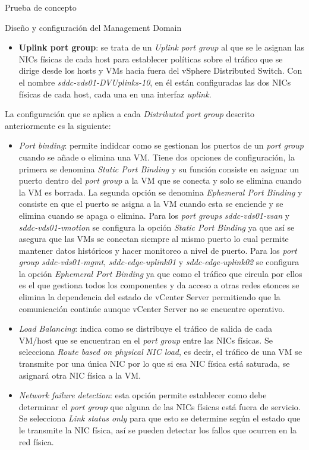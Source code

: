 \begin{section}{Prueba de concepto}
\begin{subsection}{Diseño y configuración del Management Domain}
\begin{itemize}
            \item \textbf{Uplink port group}: se trata de un \textit{Uplink port group} al que se le asignan las NICs físicas de cada host para establecer políticas sobre el tráfico que se dirige desde los hosts y VMs hacia fuera del vSphere Distributed Switch. Con el nombre \textit{sddc-vds01-DVUplinks-10}, en él están configuradas las dos NICs físicas de cada host, cada una en una interfaz \textit{uplink}.
            
    \end{itemize}
    La configuración que se aplica a cada \textit{Distributed port group} descrito anteriormente es la siguiente:
    \begin{itemize}
      \item \textit{Port binding}: permite indidcar como se gestionan los puertos de un \textit{port group} cuando se añade o elimina una VM. Tiene dos opciones de configuración, la primera se denomina \textit{Static Port Binding} y su función consiste en asignar un puerto dentro del \textit{port group} a la VM que se conecta y solo se elimina cuando la VM es borrada. La segunda opción se denomina \textit{Ephemeral Port Binding} y consiste en que el puerto se asigna a la VM cuando esta se enciende y se elimina cuando se apaga o elimina. Para los \textit{port groups} \textit{sddc-vds01-vsan} y \textit{sddc-vds01-vmotion} se configura la opción \textit{Static Port Binding} ya que así se asegura que las VMs se conectan siempre al mismo puerto lo cual permite mantener datos históricos y hacer monitoreo a nivel de puerto. Para los \textit{port group} \textit{sddc-vds01-mgmt}, \textit{sddc-edge-uplink01} y \textit{sddc-edge-uplink02} se configura la opción \textit{Ephemeral Port Binding} ya que como el tráfico que circula por ellos es el que gestiona todos los componentes y da acceso a otras redes etonces se elimina la dependencia del estado de vCenter Server permitiendo que la comunicación continúe aunque vCenter Server no se encuentre operativo.
    
      \item \textit{Load Balancing}: indica como se distribuye el tráfico de salida de cada VM/host que se encuentran en el \textit{port group} entre las NICs físicas. Se selecciona \textit{Route based on physical NIC load}, es decir, el tráfico de una VM se transmite por una única NIC por lo que si esa NIC física está saturada, se asignará otra NIC física a la VM.
      
      \item \textit{Network failure detection}: esta opción permite establecer como debe determinar el \textit{port group} que alguna de las NICs físicas está fuera de servicio. Se selecciona \textit{Link status only} para que esto se determine según el estado que le transmite la NIC física, así se pueden detectar los fallos que ocurren en la red física.
      

\end{itemize}
\end{subsection}
\end{section}
